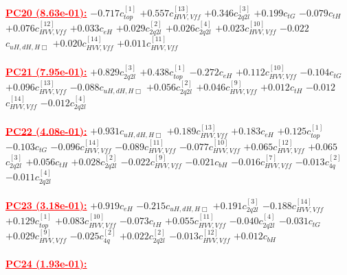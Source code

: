 \documentclass{article}
\begin{document}
\noindent \textcolor{red}{\underline{\bf{PC20} (8.63e-01):}}
{$-0.717$}{\rm $c_{top}^{[1]}$} 
{$+0.557$}{\rm $c_{HVV,Vff}^{[13]}$} 
{$+0.346$}{\rm $c_{2q2l}^{[3]}$} 
{$+0.199$}{\rm $c_{tG}$} 
{$-0.079$}{\rm $c_{tH}$} 
{$+0.076$}{\rm $c_{HVV,Vff}^{[12]}$} 
{$+0.033$}{\rm $c_{eH}$} 
{$+0.029$}{\rm $c_{2q2l}^{[2]}$} 
{$+0.026$}{\rm $c_{2q2l}^{[4]}$} 
{$+0.023$}{\rm $c_{HVV,Vff}^{[10]}$} 
{$-0.022$}{\rm $c_{uH,dH,H\Box}$} 
{$+0.020$}{\rm $c_{HVV,Vff}^{[14]}$} 
{$+0.011$}{\rm $c_{HVV,Vff}^{[11]}$} 
 \nonumber \\ \nonumber \\ 
\noindent \textcolor{red}{\underline{\bf{PC21} (7.95e-01):}}
{$+0.829$}{\rm $c_{2q2l}^{[3]}$} 
{$+0.438$}{\rm $c_{top}^{[1]}$} 
{$-0.272$}{\rm $c_{eH}$} 
{$+0.112$}{\rm $c_{HVV,Vff}^{[10]}$} 
{$-0.104$}{\rm $c_{tG}$} 
{$+0.096$}{\rm $c_{HVV,Vff}^{[13]}$} 
{$-0.088$}{\rm $c_{uH,dH,H\Box}$} 
{$+0.056$}{\rm $c_{2q2l}^{[2]}$} 
{$+0.046$}{\rm $c_{HVV,Vff}^{[9]}$} 
{$+0.012$}{\rm $c_{tH}$} 
{$-0.012$}{\rm $c_{HVV,Vff}^{[14]}$} 
{$-0.012$}{\rm $c_{2q2l}^{[4]}$} 
 \nonumber \\ \nonumber \\ 
\noindent \textcolor{red}{\underline{\bf{PC22} (4.08e-01):}}
{$+0.931$}{\rm $c_{uH,dH,H\Box}$} 
{$+0.189$}{\rm $c_{HVV,Vff}^{[13]}$} 
{$+0.183$}{\rm $c_{eH}$} 
{$+0.125$}{\rm $c_{top}^{[1]}$} 
{$-0.103$}{\rm $c_{tG}$} 
{$-0.096$}{\rm $c_{HVV,Vff}^{[14]}$} 
{$-0.089$}{\rm $c_{HVV,Vff}^{[11]}$} 
{$-0.077$}{\rm $c_{HVV,Vff}^{[10]}$} 
{$+0.065$}{\rm $c_{HVV,Vff}^{[12]}$} 
{$+0.065$}{\rm $c_{2q2l}^{[3]}$} 
{$+0.056$}{\rm $c_{tH}$} 
{$+0.028$}{\rm $c_{2q2l}^{[2]}$} 
{$-0.022$}{\rm $c_{HVV,Vff}^{[9]}$} 
{$-0.021$}{\rm $c_{bH}$} 
{$-0.016$}{\rm $c_{HVV,Vff}^{[7]}$} 
{$-0.013$}{\rm $c_{4q}^{[2]}$} 
{$-0.011$}{\rm $c_{2q2l}^{[4]}$} 
 \nonumber \\ \nonumber \\ 
\noindent \textcolor{red}{\underline{\bf{PC23} (3.18e-01):}}
{$+0.919$}{\rm $c_{eH}$} 
{$-0.215$}{\rm $c_{uH,dH,H\Box}$} 
{$+0.191$}{\rm $c_{2q2l}^{[3]}$} 
{$-0.188$}{\rm $c_{HVV,Vff}^{[14]}$} 
{$+0.129$}{\rm $c_{top}^{[1]}$} 
{$+0.083$}{\rm $c_{HVV,Vff}^{[10]}$} 
{$-0.073$}{\rm $c_{tH}$} 
{$+0.055$}{\rm $c_{HVV,Vff}^{[11]}$} 
{$-0.040$}{\rm $c_{2q2l}^{[4]}$} 
{$-0.031$}{\rm $c_{tG}$} 
{$+0.029$}{\rm $c_{HVV,Vff}^{[9]}$} 
{$-0.025$}{\rm $c_{4q}^{[2]}$} 
{$+0.022$}{\rm $c_{2q2l}^{[2]}$} 
{$-0.013$}{\rm $c_{HVV,Vff}^{[12]}$} 
{$+0.012$}{\rm $c_{bH}$} 
 \nonumber \\ \nonumber \\ 
\noindent \textcolor{red}{\underline{\bf{PC24} (1.93e-01):}}
\end{document}
